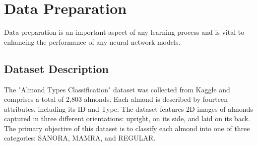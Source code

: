\documentclass[conference]{IEEEtran}
\begin{document}
\section{Data Preparation}
Data preparation is an important aspect of any learning process and is vital to enhancing the performance of any neural network models.
\newline \\
\subsection{Dataset Description}
The "Almond Types Classification" dataset was collected from Kaggle and comprises a total of 2,803 almonds. Each almond is described by fourteen attributes, including its ID and Type. The dataset features 2D images of almonds captured in three different orientations: upright, on its side, and laid on its back. The primary objective of this dataset is to classify each almond into one of three categories: SANORA, MAMRA, and REGULAR.\\
\end{document}

